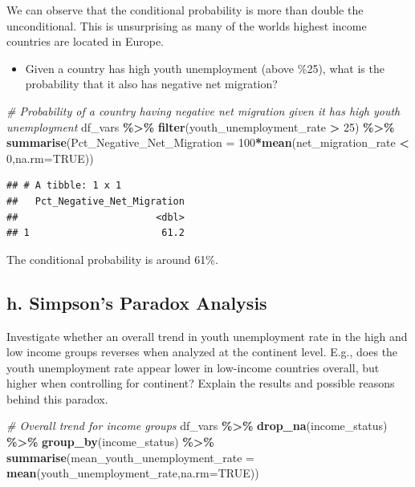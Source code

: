 \documentclass[
]{article}
\newenvironment{Shaded}{\begin{snugshade}}{\end{snugshade}}
\newcommand{\AttributeTok}[1]{\textcolor[rgb]{0.13,0.29,0.53}{#1}}
\newcommand{\CommentTok}[1]{\textcolor[rgb]{0.56,0.35,0.01}{\textit{#1}}}
\newcommand{\ConstantTok}[1]{\textcolor[rgb]{0.56,0.35,0.01}{#1}}
\newcommand{\DecValTok}[1]{\textcolor[rgb]{0.00,0.00,0.81}{#1}}
\newcommand{\FunctionTok}[1]{\textcolor[rgb]{0.13,0.29,0.53}{\textbf{#1}}}
\newcommand{\NormalTok}[1]{#1}
\newcommand{\SpecialCharTok}[1]{\textcolor[rgb]{0.81,0.36,0.00}{\textbf{#1}}}
\providecommand{\tightlist}{%
  \setlength{\itemsep}{0pt}\setlength{\parskip}{0pt}}
\begin{document}
We can observe that the conditional probability is more than double the
unconditional. This is unsurprising as many of the worlds highest income
countries are located in Europe.

\begin{itemize}
\tightlist
\item
  Given a country has high youth unemployment (above \%25), what is the
  probability that it also has negative net migration?
\end{itemize}

\begin{Shaded}
\begin{Highlighting}[]
\CommentTok{\# Probability of a country having negative net migration given it has high youth unemployment}
\NormalTok{df\_vars }\SpecialCharTok{\%\textgreater{}\%}
  \FunctionTok{filter}\NormalTok{(youth\_unemployment\_rate }\SpecialCharTok{\textgreater{}} \DecValTok{25}\NormalTok{) }\SpecialCharTok{\%\textgreater{}\%}
   \FunctionTok{summarise}\NormalTok{(}\AttributeTok{Pct\_Negative\_Net\_Migration =} \DecValTok{100}\SpecialCharTok{*}\FunctionTok{mean}\NormalTok{(net\_migration\_rate }\SpecialCharTok{\textless{}} \DecValTok{0}\NormalTok{,}\AttributeTok{na.rm=}\ConstantTok{TRUE}\NormalTok{))}
\end{Highlighting}
\end{Shaded}

\begin{verbatim}
## # A tibble: 1 x 1
##   Pct_Negative_Net_Migration
##                        <dbl>
## 1                       61.2
\end{verbatim}

The conditional probability is around 61\%.

\subsection{h. Simpson's Paradox
Analysis}\label{h.-simpsons-paradox-analysis}

Investigate whether an overall trend in youth unemployment rate in the
high and low income groups reverses when analyzed at the continent
level. E.g., does the youth unemployment rate appear lower in low-income
countries overall, but higher when controlling for continent? Explain
the results and possible reasons behind this paradox.

\begin{Shaded}
\begin{Highlighting}[]
\CommentTok{\# Overall trend for income groups}
\NormalTok{df\_vars }\SpecialCharTok{\%\textgreater{}\%}
 \FunctionTok{drop\_na}\NormalTok{(income\_status) }\SpecialCharTok{\%\textgreater{}\%}
  \FunctionTok{group\_by}\NormalTok{(income\_status) }\SpecialCharTok{\%\textgreater{}\%}
    \FunctionTok{summarise}\NormalTok{(}\AttributeTok{mean\_youth\_unemployment\_rate =} \FunctionTok{mean}\NormalTok{(youth\_unemployment\_rate,}\AttributeTok{na.rm=}\ConstantTok{TRUE}\NormalTok{))}
\end{Highlighting}
\end{Shaded}
\end{document}
